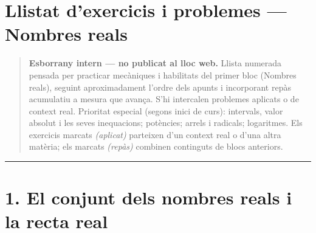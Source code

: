 \documentclass[13pt,a4paper]{extarticle}
\begin{document}
\section*{Llistat d'exercicis i problemes — Nombres reals}

\begin{quote}\small \textbf{Esborrany intern — no publicat al lloc web.} Llista numerada pensada per practicar mecàniques i habilitats del primer bloc (Nombres reals), seguint aproximadament l'ordre dels apunts i incorporant repàs acumulatiu a mesura que avança. S'hi intercalen problemes aplicats o de context real. Prioritat especial (segons inici de curs): intervals, valor absolut i les seves inequacions; potències; arrels i radicals; logaritmes. Els exercicis marcats \emph{(aplicat)} parteixen d'un context real o d'una altra matèria; els marcats \emph{(repàs)} combinen continguts de blocs anteriors.\end{quote}

\vspace{1mm}\hrule\vspace{3mm}

\section*{1. El conjunt dels nombres reals i la recta real}
\end{document}
